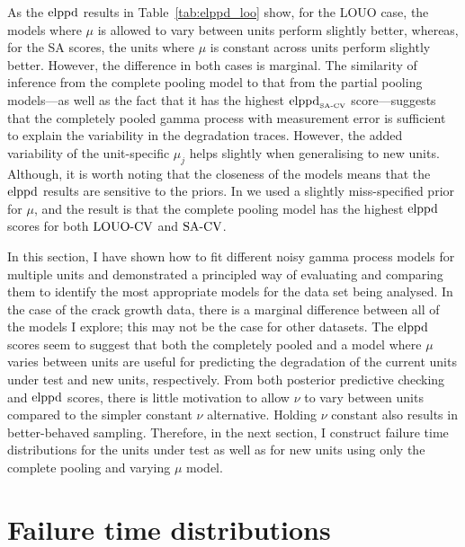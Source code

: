 As the $\hbox{elppd}$ results in Table~\ref{tab:elppd_loo} show, for the LOUO case, the models where $\mu$ is allowed to vary between units perform slightly better, whereas, for the SA scores, the units where $\mu$ is constant across units perform slightly better. However, the difference in both cases is marginal. The similarity of inference from the complete pooling model to that from the partial pooling models---as well as the fact that it has the highest $\hbox{elppd}_{\hbox{\tiny{SA-CV}}}$ score---suggests that the completely pooled gamma process with measurement error is sufficient to explain the variability in the degradation traces. However, the added variability of the unit-specific $\mu_j$ helps slightly when generalising to new units. Although, it is worth noting that the closeness of the models means that the $\hbox{elppd}$ results are sensitive to the priors. In \citet{leadbetter2024} we used a slightly miss-specified prior for $\mu$, and the result is that the complete pooling model has the highest $\hbox{elppd}$ scores for both $\hbox{LOUO-CV}$ and $\hbox{SA-CV}$.

In this section, I have shown how to fit different noisy gamma process models for multiple units and demonstrated a principled way of evaluating and comparing them to identify the most appropriate models for the data set being analysed. In the case of the crack growth data, there is a marginal difference between all of the models I explore; this may not be the case for other datasets. The $\hbox{elppd}$ scores seem to suggest that both the completely pooled and a model where $\mu$ varies between units are useful for predicting the degradation of the current units under test and new units, respectively. From both posterior predictive checking and $\hbox{elppd}$ scores, there is little motivation to allow $\nu$ to vary between units compared to the simpler constant $\nu$ alternative. Holding $\nu$ constant also results in better-behaved sampling. Therefore, in the next section, I construct failure time distributions for the units under test as well as for new units using only the complete pooling and varying $\mu$ model.

\section{Failure time distributions} \label{sec:unit-to-unit-ft}

